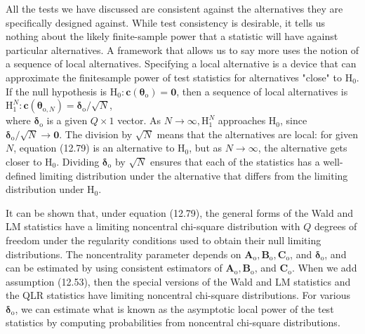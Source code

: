 \documentclass[10pt]{article}
\begin{document}
All the tests we have discussed are consistent against the alternatives they are specifically designed against. While test consistency is desirable, it tells us nothing about the likely finite-sample power that a statistic will have against particular alternatives. A framework that allows us to say more uses the notion of a sequence of local alternatives. Specifying a local alternative is a device that can approximate the finitesample power of test statistics for alternatives "close" to $\mathrm{H}_{0}$. If the null hypothesis is $\mathrm{H}_{0}: \mathbf{c}\left(\boldsymbol{\theta}_{\mathrm{o}}\right)=\mathbf{0}$, then a sequence of local alternatives is\\
$\mathrm{H}_{1}^{N}: \mathbf{c}\left(\boldsymbol{\theta}_{\mathrm{o}, N}\right)=\boldsymbol{\delta}_{\mathrm{o}} / \sqrt{N}$,\\
where $\boldsymbol{\delta}_{\mathrm{o}}$ is a given $Q \times 1$ vector. As $N \rightarrow \infty, \mathrm{H}_{1}^{N}$ approaches $\mathrm{H}_{0}$, since $\boldsymbol{\delta}_{\mathrm{o}} / \sqrt{N} \rightarrow \mathbf{0}$. The division by $\sqrt{N}$ means that the alternatives are local: for given $N$, equation (12.79) is an alternative to $\mathrm{H}_{0}$, but as $N \rightarrow \infty$, the alternative gets closer to $\mathrm{H}_{0}$. Dividing $\boldsymbol{\delta}_{\mathrm{o}}$ by $\sqrt{N}$ ensures that each of the statistics has a well-defined limiting distribution under the alternative that differs from the limiting distribution under $\mathrm{H}_{0}$.

It can be shown that, under equation (12.79), the general forms of the Wald and LM statistics have a limiting noncentral chi-square distribution with $Q$ degrees of\\
freedom under the regularity conditions used to obtain their null limiting distributions. The noncentrality parameter depends on $\mathbf{A}_{\mathrm{o}}, \mathbf{B}_{\mathrm{o}}, \mathbf{C}_{\mathrm{o}}$, and $\boldsymbol{\delta}_{\mathrm{o}}$, and can be estimated by using consistent estimators of $\mathbf{A}_{\mathrm{o}}, \mathbf{B}_{\mathrm{o}}$, and $\mathbf{C}_{\mathrm{o}}$. When we add assumption (12.53), then the special versions of the Wald and LM statistics and the QLR statistics have limiting noncentral chi-square distributions. For various $\boldsymbol{\delta}_{\mathrm{o}}$, we can estimate what is known as the asymptotic local power of the test statistics by computing probabilities from noncentral chi-square distributions.
\end{document}

